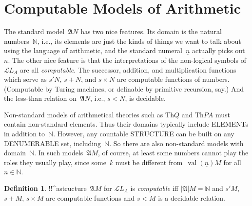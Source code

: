 \documentclass[10pt,a4paper]{article}
\newcommand*{\olup}[1]{\MakeUppercase{#1}}
\theoremstyle{plain}
\theoremstyle{definition}
\newtheorem{defn}[thm]{Definition}
\theoremstyle{remark}
\newenvironment{explain}{}{}
\newcommand*{\olfileid}[3]{}
\providecommand{\Struct}{\ensuremath{\mathfrak{A}}}
\providecommand{\Domain}{\ensuremath{|\mathfrak{A}|}}
\providecommand{\Assign}{\ensuremath{s}}
\providecommand{\Lang}{\ensuremath{\mathcal{L}}}
\providecommand{\Th}{\ensuremath{\mathrm{Th}}}
\providecommand{\num}[1]{\underline{#1}}
\providecommand{\Nat}{\ensuremath{\mathbb{N}}}
\providecommand{\Value}[1]{\operatorname{val}(#1)}
\begin{document}



\olfileid{mod}{mar}{cmp}
\section{Computable Models of Arithmetic}

\begin{explain}
The standard model~$\Struct{N}$ has two nice features. Its domain is
the natural numbers~$\Nat$, i.e., its elements are just the kinds of
things we want to talk about using the language of arithmetic, and the
standard numeral~$\num{n}$ actually picks out~$n$. The other nice
feature is that the interpretations of the non-logical symbols
of~$\Lang{L_A}$ are all \emph{computable}. The successor, addition,
and multiplication functions which serve as $\Assign{\prime}{N}$,
$\Assign{+}{N}$, and $\Assign{\times}{N}$ are computable functions of
numbers. (Computable by Turing machines, or definable by primitive
recursion, say.) And the less-than relation on~$\Struct{N}$, i.e.,
$\Assign{<}{N}$, is decidable.

Non-standard models of arithmetical theories such as $\Th{Q}$ and
$\Th{PA}$ must contain non-standard elements. Thus their domains
typically include \olup{element}s in addition to~$\Nat$. However, any
countable \olup{structure} can be built on any \olup{denumerable} set,
including~$\Nat$. So there are also non-standard models with
domain~$\Nat$. In such models~$\Struct{M}$, of course, at least some
numbers cannot play the roles they usually play, since some~$k$ must
be different from~$\Value{\num{n}}{M}$ for all~$n \in \Nat$.
\end{explain}

\begin{defn}
!!^a{structure}~$\Struct{M}$ for $\Lang{L_A}$ is \emph{computable} iff
  $\Domain{M} = \Nat$ and $\Assign{\prime}{M}$, $\Assign{+}{M}$,
  $\Assign{\times}{M}$ are computable functions and $\Assign{<}{M}$ is
  a decidable relation.
\end{defn}
\end{document}
